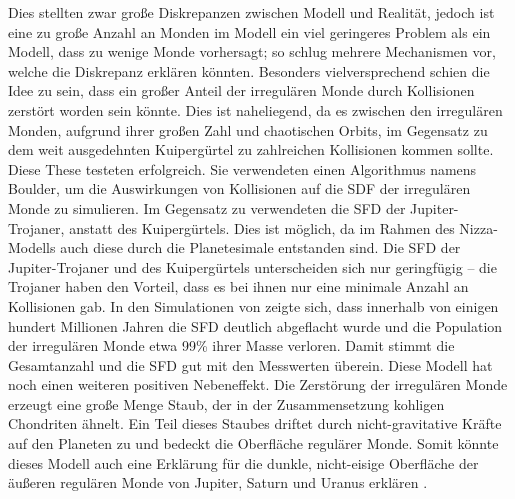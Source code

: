 \documentclass[12pt,a4paper,twoside,open=right,bibliography=totoc]{scrbook}
\renewcommand{\cite}{ \citep}
\begin{document}
Dies stellten zwar große Diskrepanzen zwischen Modell und Realität, jedoch ist eine zu große Anzahl an Monden im Modell ein viel geringeres Problem als ein Modell, dass zu wenige Monde vorhersagt; so schlug \cite{Nesvorny2007} mehrere Mechanismen vor, welche die Diskrepanz erklären könnten. 
Besonders vielversprechend schien die Idee zu sein, dass ein großer Anteil der irregulären Monde durch Kollisionen zerstört worden sein könnte. Dies ist naheliegend, da es zwischen den irregulären Monden, aufgrund ihrer großen Zahl und chaotischen Orbits, im Gegensatz zu dem weit ausgedehnten Kuipergürtel zu zahlreichen Kollisionen kommen sollte.
Diese These testeten \cite{Bottke2010} erfolgreich. Sie verwendeten einen Algorithmus namens Boulder, um die Auswirkungen von Kollisionen auf die SDF der irregulären Monde zu simulieren.
Im Gegensatz zu \cite{Nesvorny2007} verwendeten \cite{Bottke2010} die SFD der Jupiter-Trojaner, anstatt des Kuipergürtels. Dies ist möglich, da im Rahmen des Nizza-Modells auch diese durch die Planetesimale entstanden sind. Die SFD der Jupiter-Trojaner und des Kuipergürtels unterscheiden sich nur geringfügig -- die Trojaner haben den Vorteil, dass es bei ihnen nur eine minimale Anzahl an Kollisionen gab.
In den Simulationen von \cite{Bottke2010} zeigte sich, dass innerhalb von einigen hundert Millionen Jahren die SFD deutlich abgeflacht wurde und die Population der irregulären Monde etwa 99\% ihrer Masse verloren.
Damit stimmt die Gesamtanzahl und die SFD gut mit den Messwerten überein. %
Diese Modell hat noch einen weiteren positiven Nebeneffekt. Die Zerstörung der irregulären Monde erzeugt eine große Menge Staub, der in der Zusammensetzung kohligen Chondriten ähnelt.
Ein Teil dieses Staubes driftet durch nicht-gravitative Kräfte auf den Planeten zu und bedeckt die Oberfläche regulärer Monde. Somit könnte dieses Modell auch eine Erklärung für die dunkle, nicht-eisige Oberfläche der äußeren regulären Monde von Jupiter, Saturn und Uranus erklären\cite{Bottke2010}.
\end{document}
